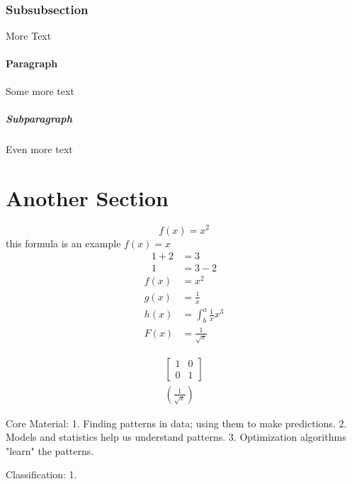 \documentclass[11pt]{article}
\begin{document}
\subsubsection{Subsubsection} 
More Text
\paragraph{Paragraph}
Some more text 
\subparagraph{Subparagraph} 
Even more text 
\section{Another Section} 
\fi

\begin{equation*}
	f(x) = x^2
\end{equation*}
this formula is an example $f(x) = x$
\begin{align*}
1 + 2 &= 3\\
1 &= 3 - 2
\end{align*}
\begin{align*}
f(x) &= x ^ 2\\
g(x) &= \frac{1}{x}\\
h(x) &= \int^a_b \frac{1}{x}x^3\\
F(x) &= \frac{1}{\sqrt{x}}
\end{align*}

\begin{align*}
\left[
\begin{matrix}
1 & 0\\
0 & 1
\end{matrix}
\right] \\
\left(\frac{1}{\sqrt{x}}\right)
\end{align*}

\newpage
Core Material:
1. Finding patterns in data; using them to make predictions. 
2. Models and statistics help us understand patterns. 
3. Optimization algorithms "learn" the patterns.

Classification: 
1. 
\end{document}
